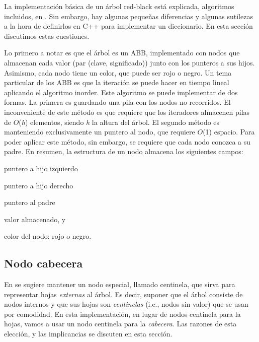La implementación básica de un árbol red-\/black está explicada, algoritmos incluidos, en \cite{CormenLeisersonRivestStein2009}. Sin embargo, hay algunas pequeñas diferencias y algunas sutilezas a la hora de definirlos en C++ para implementar un diccionario. En esta sección discutimos estas cuestiones.

Lo primero a notar es que el árbol es un A\-B\-B, implementado con nodos que almacenan cada valor (par {\ttfamily (clave, significado)}) junto con los punteros a sus hijos. Asimismo, cada nodo tiene un color, que puede ser rojo o negro. Un tema particular de los A\-B\-B es que la iteración se puede hacer en tiempo lineal aplicando el algoritmo inorder. Este algoritmo se puede implementar de dos formas. La primera es guardando una pila con los nodos no recorridos. El inconveniente de este método es que requiere que los iteradores almacenen pilas de $O$({\itshape h}) elementos, siendo {\itshape h} la altura del árbol. El segundo método es manteniendo exclusivamente un puntero al nodo, que requiere $O$(1) espacio. Para poder aplicar este método, sin embargo, se requiere que cada nodo conozca a su padre. En resumen, la estructura de un nodo almacena los siguientes campos\-:
\begin{DoxyItemize}
\item puntero a hijo izquierdo
\item puntero a hijo derecho
\item puntero al padre
\item valor almacenado, y
\item color del nodo\-: rojo o negro.
\end{DoxyItemize}\hypertarget{Implementacion_Cabecera}{}\subsection{Nodo cabecera}\label{Implementacion_Cabecera}
En \cite{CormenLeisersonRivestStein2009} se sugiere mantener un nodo especial, llamado centinela, que sirva para representar hojas {\itshape externas} al árbol. Es decir, suponer que el árbol consiste de nodos internos y que sus hojas son {\itshape centinelas} (i.\-e., nodos sin valor) que se usan por comodidad. En esta implementación, en lugar de nodos centinela para la hojas, vamos a usar un nodo centinela para la {\itshape cabecera}. Las razones de esta elección, y las implicancias se discuten en esta sección.

